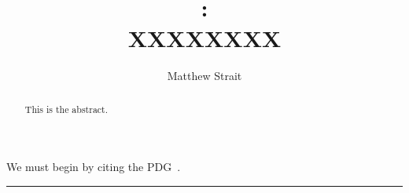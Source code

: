 \documentclass[oneside,10pt,twocolumn]{article}
\title{\doc:\\
XXXXXXXX }
\author{Matthew Strait}
\begin{document}
\maketitle

\begin{abstract}

This is the abstract.

\end{abstract}

We must begin by citing the PDG~\cite{pdg2016}.


\begin{small}  \end{small}
\hrule


\end{document}
